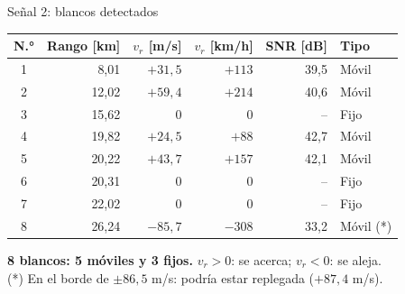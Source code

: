\begin{frame}{Señal 2: blancos detectados}
  \centering
  \small
  \renewcommand{\arraystretch}{1.15}
  \begin{tabular}{crrrrl}
    \toprule
    \textbf{N.°} & \textbf{Rango [km]} & \textbf{$v_r$ [m/s]} & \textbf{$v_r$ [km/h]} & \textbf{SNR [dB]} & \textbf{Tipo} \\
    \midrule
    1 & 8,01 & $+31{,}5$ & $+113$ & 39,5 & Móvil \\
    2 & 12,02 & $+59{,}4$ & $+214$ & 40,6 & Móvil \\
    3 & 15,62 & 0 & 0 & -- & Fijo \\
    4 & 19,82 & $+24{,}5$ & $+88$ & 42,7 & Móvil \\
    5 & 20,22 & $+43{,}7$ & $+157$ & 42,1 & Móvil \\
    6 & 20,31 & 0 & 0 & -- & Fijo \\
    7 & 22,02 & 0 & 0 & -- & Fijo \\
    8 & 26,24 & $-85{,}7$ & $-308$ & 33,2 & Móvil (*) \\
    \bottomrule
  \end{tabular}
  \vspace{0.2cm}

  \raggedright\footnotesize
  \textbf{8 blancos: 5 móviles y 3 fijos.} $v_r > 0$: se acerca; $v_r < 0$: se aleja. \\
  (*) En el borde de $\pm 86{,}5$ m/s: podría estar replegada ($+87{,}4$ m/s).
\end{frame}

